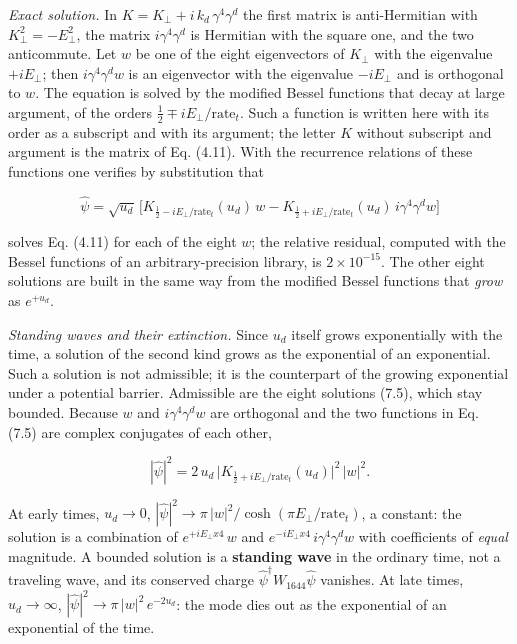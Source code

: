 \documentclass[
  10pt,
]{article}
\begin{document}
\emph{Exact solution.} In \(K=K_\perp+i\,k_d\,\gamma^4\gamma^d\) the
first matrix is anti-Hermitian with \(K_\perp^2=-E_\perp^2\), the matrix
\(i\gamma^4\gamma^d\) is Hermitian with the square one, and the two
anticommute. Let \(w\) be one of the eight eigenvectors of \(K_\perp\)
with the eigenvalue \(+iE_\perp\); then \(i\gamma^4\gamma^dw\) is an
eigenvector with the eigenvalue \(-iE_\perp\) and is orthogonal to
\(w\). The equation is solved by the modified Bessel functions that
decay at large argument, of the orders
\(\tfrac12\mp iE_\perp/\mathrm{rate}_t\). Such a function is written
here with its order as a subscript and with its argument; the letter
\(K\) without subscript and argument is the matrix of Eq. (4.11). With
the recurrence relations of these functions one verifies by substitution
that

\[\hat\psi=\sqrt{u_d}\,\Big[K_{\frac12-iE_\perp/\mathrm{rate}_t}(u_d)\,w
-K_{\frac12+iE_\perp/\mathrm{rate}_t}(u_d)\,i\gamma^4\gamma^dw\Big]\tag{7.5}\]

solves Eq. (4.11) for each of the eight \(w\); the relative residual,
computed with the Bessel functions of an arbitrary-precision library, is
\(2\times10^{-15}\). The other eight solutions are built in the same way
from the modified Bessel functions that \emph{grow} as \(e^{+u_d}\).

\emph{Standing waves and their extinction.} Since \(u_d\) itself grows
exponentially with the time, a solution of the second kind grows as the
exponential of an exponential. Such a solution is not admissible; it is
the counterpart of the growing exponential under a potential barrier.
Admissible are the eight solutions (7.5), which stay bounded. Because
\(w\) and \(i\gamma^4\gamma^dw\) are orthogonal and the two functions in
Eq. (7.5) are complex conjugates of each other,

\[|\hat\psi|^2=2\,u_d\,\big|K_{\frac12+iE_\perp/\mathrm{rate}_t}(u_d)\big|^2\,|w|^2.\tag{7.6}\]

At early times, \(u_d\to0\),
\(|\hat\psi|^2\to\pi\,|w|^2/\cosh(\pi E_\perp/\mathrm{rate}_t)\), a
constant: the solution is a combination of \(e^{+iE_\perp x4}\,w\) and
\(e^{-iE_\perp x4}\,i\gamma^4\gamma^dw\) with coefficients of
\emph{equal} magnitude. A bounded solution is a \textbf{standing wave}
in the ordinary time, not a traveling wave, and its conserved charge
\(\hat\psi^\dagger W_{1644}\hat\psi\) vanishes. At late times,
\(u_d\to\infty\), \(|\hat\psi|^2\to\pi\,|w|^2\,e^{-2u_d}\): the mode
dies out as the exponential of an exponential of the time.
\end{document}
